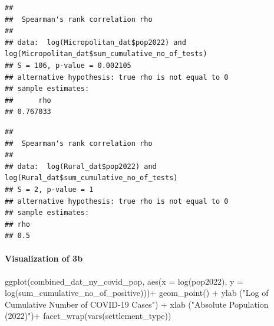 \documentclass[
  12pt,
]{article}
\newenvironment{Shaded}{\begin{snugshade}}{\end{snugshade}}
\newcommand{\AttributeTok}[1]{\textcolor[rgb]{0.77,0.63,0.00}{#1}}
\newcommand{\DocumentationTok}[1]{\textcolor[rgb]{0.56,0.35,0.01}{\textbf{\textit{#1}}}}
\newcommand{\FunctionTok}[1]{\textcolor[rgb]{0.00,0.00,0.00}{#1}}
\newcommand{\NormalTok}[1]{#1}
\newcommand{\OtherTok}[1]{\textcolor[rgb]{0.56,0.35,0.01}{#1}}
\newcommand{\SpecialCharTok}[1]{\textcolor[rgb]{0.00,0.00,0.00}{#1}}
\newcommand{\StringTok}[1]{\textcolor[rgb]{0.31,0.60,0.02}{#1}}
\begin{document}
\begin{verbatim}
## 
##  Spearman's rank correlation rho
## 
## data:  log(Micropolitan_dat$pop2022) and log(Micropolitan_dat$sum_cumulative_no_of_tests)
## S = 106, p-value = 0.002105
## alternative hypothesis: true rho is not equal to 0
## sample estimates:
##      rho 
## 0.767033
\end{verbatim}

\begin{Shaded}
\end{Shaded}

\begin{verbatim}
## 
##  Spearman's rank correlation rho
## 
## data:  log(Rural_dat$pop2022) and log(Rural_dat$sum_cumulative_no_of_tests)
## S = 2, p-value = 1
## alternative hypothesis: true rho is not equal to 0
## sample estimates:
## rho 
## 0.5
\end{verbatim}

\hypertarget{visualization-of-3b}{%
\paragraph{Visualization of 3b}\label{visualization-of-3b}}

\begin{Shaded}
\begin{Highlighting}[]
\FunctionTok{ggplot}\NormalTok{(combined\_dat\_ny\_covid\_pop, }\FunctionTok{aes}\NormalTok{(}\AttributeTok{x =} \FunctionTok{log}\NormalTok{(pop2022),}
                                      \AttributeTok{y =} \FunctionTok{log}\NormalTok{(sum\_cumulative\_no\_of\_positive)))}\SpecialCharTok{+}
  \FunctionTok{geom\_point}\NormalTok{() }\SpecialCharTok{+} 
  \FunctionTok{ylab}\NormalTok{ (}\StringTok{"Log of Cumulative Number of COVID{-}19 Cases"}\NormalTok{) }\SpecialCharTok{+}
  \FunctionTok{xlab}\NormalTok{ (}\StringTok{"Absolute Population (2022)"}\NormalTok{)}\SpecialCharTok{+}
  \FunctionTok{facet\_wrap}\NormalTok{(}\FunctionTok{vars}\NormalTok{(settlement\_type)) }
\end{Highlighting}
\end{Shaded}
\end{document}
